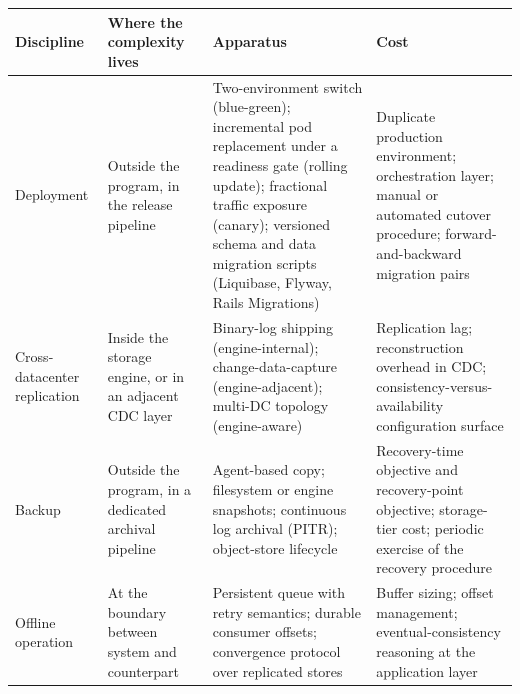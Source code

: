 \documentclass[
]{article}
\newcounter{none} %
\begin{document}
{\def\LTcaptype{none} %
\begin{longtable}[]{@{}
  >{\raggedright\arraybackslash}p{}
  >{\raggedright\arraybackslash}p{}
  >{\raggedright\arraybackslash}p{}
  >{\raggedright\arraybackslash}p{}@{}}
\toprule\noalign{}
\begin{minipage}[b]{\linewidth}\raggedright
Discipline
\end{minipage} & \begin{minipage}[b]{\linewidth}\raggedright
Where the complexity lives
\end{minipage} & \begin{minipage}[b]{\linewidth}\raggedright
Apparatus
\end{minipage} & \begin{minipage}[b]{\linewidth}\raggedright
Cost
\end{minipage} \\
\midrule\noalign{}
\endhead
\bottomrule\noalign{}
\endlastfoot
Deployment & Outside the program, in the release pipeline &
Two-environment switch (blue-green); incremental pod replacement under a
readiness gate (rolling update); fractional traffic exposure (canary);
versioned schema and data migration scripts (Liquibase, Flyway, Rails
Migrations) & Duplicate production environment; orchestration layer;
manual or automated cutover procedure; forward-and-backward migration
pairs \\
Cross-datacenter replication & Inside the storage engine, or in an
adjacent CDC layer & Binary-log shipping (engine-internal);
change-data-capture (engine-adjacent); multi-DC topology (engine-aware)
& Replication lag; reconstruction overhead in CDC;
consistency-versus-availability configuration surface \\
Backup & Outside the program, in a dedicated archival pipeline &
Agent-based copy; filesystem or engine snapshots; continuous log
archival (PITR); object-store lifecycle & Recovery-time objective and
recovery-point objective; storage-tier cost; periodic exercise of the
recovery procedure \\
Offline operation & At the boundary between system and counterpart &
Persistent queue with retry semantics; durable consumer offsets;
convergence protocol over replicated stores & Buffer sizing; offset
management; eventual-consistency reasoning at the application layer \\
\end{longtable}
}
\end{document}
